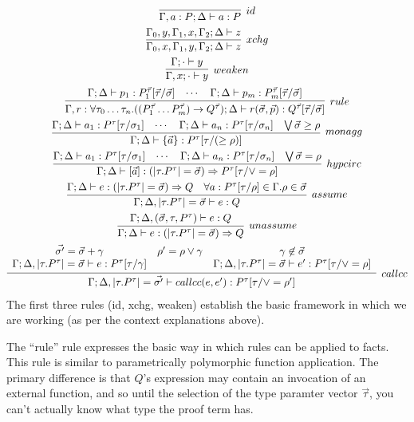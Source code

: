 \begin{gather*}
  \infer[id]{\Gamma, a : P; \Delta \ds a : P}{}\\
  \infer[xchg]{\Gamma_0, x, \Gamma_1, y, \Gamma_2; \Delta \ds z}{\Gamma_0, y, \Gamma_1, x, \Gamma_2; \Delta \ds z}\\
  \infer[weaken]{\Gamma, x; \cdot \ds y}{\Gamma; \cdot \ds y}\\
  \infer[rule]{\Gamma, r : \forall \tau_0 \ldots \tau_n. ((P_1^{\vec{\tau}} \ldots P_m^{\vec{\tau}}) \rightarrow Q^{\vec{\tau}}); \Delta \ds r(\vec{\sigma}, \vec{p}) : Q^{\vec{\tau}}[\vec{\tau}/\vec{\sigma}]}{\Gamma; \Delta \ds p_1 : P_1^{\vec{\tau}}[\vec{\tau}/\vec{\sigma}] & \cdots & \Gamma; \Delta \ds p_m : P_m^{\vec{\tau}}[\vec{\tau}/\vec{\sigma}]}\\
  \infer[monagg]{\Gamma; \Delta \ds \{\vec{a}\} : P^\tau[\tau/(\geq \rho)]}{\Gamma; \Delta \ds a_1 : P^\tau[\tau/\sigma_1] & \cdots & \Gamma; \Delta \ds a_n : P^\tau[\tau/\sigma_n] & \bigvee \vec{\sigma} \geq \rho}\\
  \infer[hypcirc]{\Gamma; \Delta\vdash [\vec{a}] : (|\tau. P^\tau| = \vec{\sigma}) \Rightarrow P^\tau[\tau/\vee = \rho]}{\Gamma; \Delta \ds a_1 : P^\tau[\tau/\sigma_1] & \cdots & \Gamma; \Delta \ds a_n : P^\tau[\tau/\sigma_n] & \bigvee \vec{\sigma} = \rho}\\
  \infer[assume]{\Gamma; \Delta,  |\tau. P^\tau| = \vec{\sigma} \ds e : Q}{\Gamma; \Delta \ds e: (|\tau. P^\tau| = \vec{\sigma}) \Rightarrow Q & \forall a : P^\tau[\tau/\rho] \in \Gamma. \rho \in \vec{\sigma}}\\
  \infer[unassume]{\Gamma; \Delta \ds e : (|\tau. P^\tau| = \vec{\sigma}) \Rightarrow Q}{\Gamma; \Delta, (\vec{\sigma}, \tau, P^\tau) \ds e : Q}\\
  \infer[callcc]{\Gamma; \Delta, |\tau. P^\tau| = \vec{\sigma'} \ds callcc(e, e') : P^\tau[\tau/\vee = \rho']}{
    \begin{array}{ccc}
      \vec{\sigma'} = \vec{\sigma} + \gamma & \rho' = \rho \vee \gamma & \gamma \not \in \vec{\sigma} \\
      \Gamma; \Delta, |\tau. P^\tau| = \vec{\sigma} \ds e : P^\tau[\tau/\gamma] & & \Gamma; \Delta, |\tau.P^\tau|=\vec{\sigma} \ds e' : P^\tau[\tau/\vee = \rho]
  \end{array}}
\end{gather*}
The first three rules (id, xchg, weaken) establish the basic framework in which we are working (as per the context explanations above).

The ``rule'' rule expresses the basic way in which rules can be applied to facts.
This rule is similar to parametrically polymorphic function application.
The primary difference is that $Q$'s expression may contain an invocation of an external function, and so until the selection of the type paramter vector $\vec{\tau}$, you can't actually know what type the proof term has.

